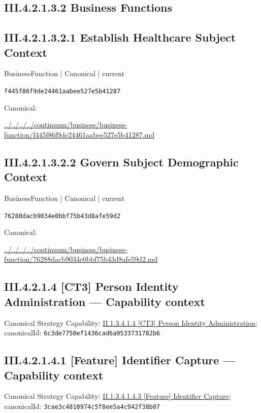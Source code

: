\documentclass[10pt,a4paper]{article}
\begin{document}
\subsection*{III.4.2.1.3.2 Business Functions}
\subsection*{III.4.2.1.3.2.1 Establish Healthcare Subject Context}
\label{element-f445f86f9de24461aabee527e5b41287}
{\small BusinessFunction | Canonical | current}\par
\texttt{f445f86f9de24461aabee527e5b41287}\par
Canonical: \par
{\footnotesize\url{../../../../continuum/business/business-function/f445f86f9de24461aabee527e5b41287.md}}\par
\subsection*{III.4.2.1.3.2.2 Govern Subject Demographic Context}
\label{element-76288dacb9034e0bbf75b43d8afe59d2}
{\small BusinessFunction | Canonical | current}\par
\texttt{76288dacb9034e0bbf75b43d8afe59d2}\par
Canonical: \par
{\footnotesize\url{../../../../continuum/business/business-function/76288dacb9034e0bbf75b43d8afe59d2.md}}\par
\subsection*{III.4.2.1.4 [CT3] Person Identity Administration — Capability context}
Canonical Strategy Capability: \hyperref[element-6c3de7750ef1436cad6a9533731782b6]{II.1.3.4.1.4 [CT3] Person Identity Administration}; canonicalId: \texttt{6c3de7750ef1436cad6a9533731782b6}\par
\subsection*{III.4.2.1.4.1 [Feature] Identifier Capture — Capability context}
Canonical Strategy Capability: \hyperref[element-3cae3c4810974c5f8ee5a4c942f38b07]{II.1.3.4.1.4.3 [Feature] Identifier Capture}; canonicalId: \texttt{3cae3c4810974c5f8ee5a4c942f38b07}\par
\end{document}
